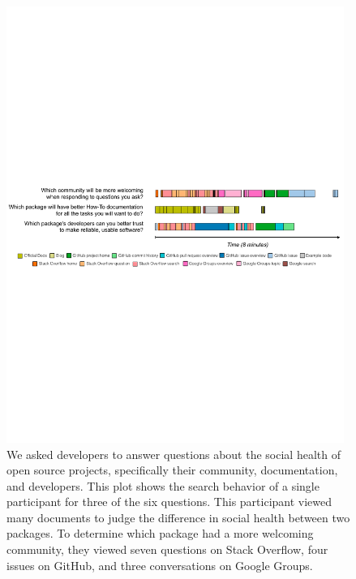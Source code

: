\begin{figure}
\centering
\includegraphics[width=0.98\textwidth]{figures/visits}
\caption{%
We asked developers to answer questions about the social health of open source projects,
specifically their community, documentation, and developers.
This plot shows the search behavior of a single participant for three of the six questions.
This participant viewed many documents to judge the difference in social health between two packages.
To determine which package had a more welcoming community, they viewed seven questions on Stack Overflow, four issues on GitHub, and three conversations on Google Groups.
}
\label{fig:visits}
\end{figure}
